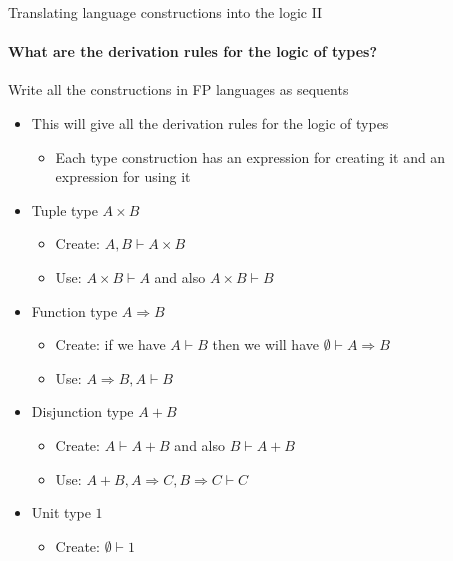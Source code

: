 \documentclass[english]{beamer}
\begin{document}
\begin{frame}{Translating language constructions into the logic II}


\framesubtitle{What are the derivation rules for the logic of types?}

Write all the constructions in FP languages as sequents
\begin{itemize}
\item This will give all the derivation rules for the logic of types
\begin{itemize}
\item Each type construction has an expression for creating it and an expression
for using it
\end{itemize}
\item Tuple type $A\times B$
\begin{itemize}
\item Create: $A,B\vdash A\times B$ 
\item Use: $A\times B\vdash A$ and also $A\times B\vdash B$
\end{itemize}
\item Function type $A\Rightarrow B$
\begin{itemize}
\item Create: if we have $A\vdash B$ then we will have $\emptyset\vdash A\Rightarrow B$ 
\item Use: $A\Rightarrow B,A\vdash B$
\end{itemize}
\item Disjunction type $A+B$
\begin{itemize}
\item Create: $A\vdash A+B$ and also $B\vdash A+B$
\item Use: $A+B,A\Rightarrow C,B\Rightarrow C\vdash C$
\end{itemize}
\item Unit type $1$
\begin{itemize}
\item Create: $\emptyset\vdash1$
\end{itemize}
\end{itemize}
\end{frame}
\end{document}
